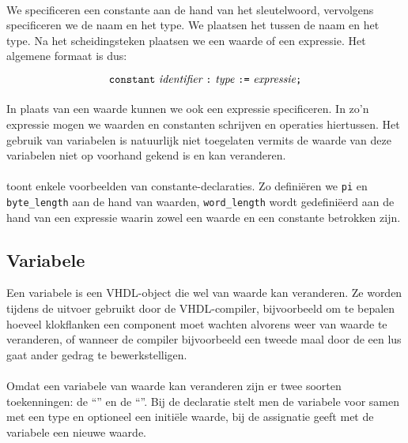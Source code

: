 \paragraph{}
We specificeren een constante aan de hand van het  sleutelwoord, vervolgens specificeren we de naam en het type. We plaatsen het \vhdltermen{:} tussen de naam en het type. Na het \vhdltermen{:=} scheidingsteken plaatsen we een waarde of een expressie. Het algemene formaat is dus:

\begin{equation}%
\vhdltermen{constant}\ \textit{identifier}\ \vhdltermen{:}\ \textit{type}\ \vhdltermen{:=}\ \textit{expressie}\vhdltermen{;}
\end{equation}

\paragraph{}
In plaats van een waarde kunnen we ook een expressie specificeren. In zo'n expressie mogen we waarden en constanten schrijven en operaties hiertussen. Het gebruik van variabelen is natuurlijk niet toegelaten vermits de waarde van deze variabelen niet op voorhand gekend is en kan veranderen.


\paragraph{}
 toont enkele voorbeelden van constante-declaraties. Zo defini\"eren we \texttt{pi} en \texttt{byte\_length} aan de hand van waarden, \texttt{word\_length} wordt gedefini\"eerd aan de hand van een expressie waarin zowel een waarde en een constante betrokken zijn.

\subsection{Variabele}
Een variabele is een VHDL-object die wel van waarde kan veranderen. Ze worden tijdens de uitvoer gebruikt door de VHDL-compiler, bijvoorbeeld om te bepalen hoeveel klokflanken een component moet wachten alvorens weer van waarde te veranderen, of wanneer de compiler bijvoorbeeld een tweede maal door de een lus gaat ander gedrag te bewerkstelligen.

\paragraph{}
Omdat een variabele van waarde kan veranderen zijn er twee soorten toekenningen: de ``'' en de ``''. Bij de declaratie stelt men de variabele voor samen met een type en optioneel een initi\"ele waarde, bij de assignatie geeft met de variabele een nieuwe waarde.

